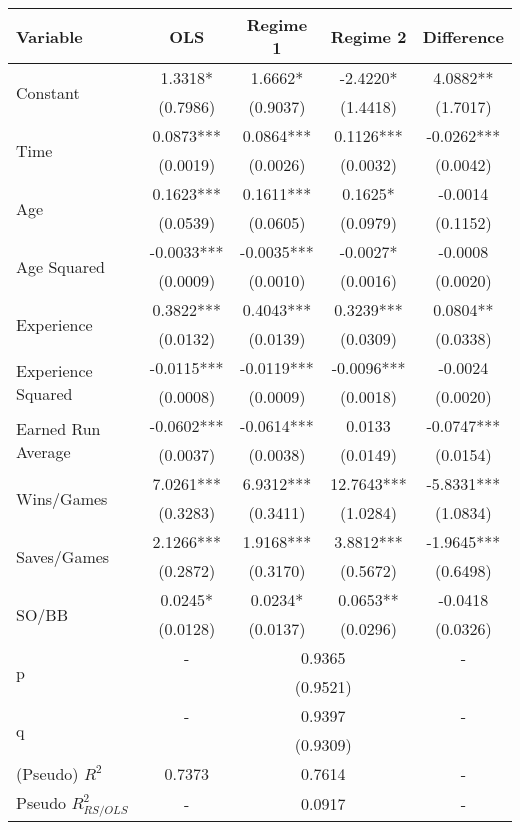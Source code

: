 \documentclass[12pt]{article}
\begin{document}
\begin{table}
\begin{center}
\begin{tabular}{l|c|cc|c} 
 Variable & OLS & Regime 1 & Regime 2 & Difference \\ \hline 

 \multirow{2}{*}{Constant} & 1.3318* & 1.6662* & -2.4220* & 4.0882** \\ 
 & (0.7986) & (0.9037) & (1.4418) & (1.7017) \\ [0.4pc]
 \multirow{2}{*}{Time} & 0.0873*** & 0.0864*** & 0.1126*** & -0.0262*** \\ 
 & (0.0019) & (0.0026) & (0.0032) & (0.0042) \\ [0.4pc]
 \multirow{2}{*}{Age} & 0.1623*** & 0.1611*** & 0.1625* & -0.0014  \\ 
 & (0.0539) & (0.0605) & (0.0979) & (0.1152) \\ [0.4pc]
 \multirow{2}{*}{Age Squared} & -0.0033*** & -0.0035*** & -0.0027* & -0.0008  \\ 
 & (0.0009) & (0.0010) & (0.0016) & (0.0020) \\ [0.4pc]
 \multirow{2}{*}{Experience} & 0.3822*** & 0.4043*** & 0.3239*** & 0.0804** \\ 
 & (0.0132) & (0.0139) & (0.0309) & (0.0338) \\ [0.4pc]
 \multirow{2}{*}{Experience Squared} & -0.0115*** & -0.0119*** & -0.0096*** & -0.0024  \\ 
 & (0.0008) & (0.0009) & (0.0018) & (0.0020) \\ [0.4pc]
 \multirow{2}{*}{Earned Run Average} & -0.0602*** & -0.0614*** & 0.0133  & -0.0747*** \\ 
 & (0.0037) & (0.0038) & (0.0149) & (0.0154) \\ [0.4pc]
 \multirow{2}{*}{Wins/Games} & 7.0261*** & 6.9312*** & 12.7643*** & -5.8331*** \\ 
 & (0.3283) & (0.3411) & (1.0284) & (1.0834) \\ [0.4pc]
 \multirow{2}{*}{Saves/Games} & 2.1266*** & 1.9168*** & 3.8812*** & -1.9645*** \\ 
 & (0.2872) & (0.3170) & (0.5672) & (0.6498) \\ [0.4pc]
 \multirow{2}{*}{SO/BB} & 0.0245* & 0.0234* & 0.0653** & -0.0418  \\ 
 & (0.0128) & (0.0137) & (0.0296) & (0.0326) \\ [0.4pc]\hline 
\multirow{2}{*}{p} & - & \multicolumn{2}{c|}{0.9365} & - \\ 
 & & \multicolumn{2}{c|}{(0.9521)} & \\ [0.4pc] 
\multirow{2}{*}{q} & - & \multicolumn{2}{c|}{0.9397} & - \\ 
 & & \multicolumn{2}{c|}{(0.9309)} & \\ \hline 
(Pseudo) $R^2$ & 0.7373 & \multicolumn{2}{c|}{0.7614} & - \\ 
Pseudo $R_{RS/OLS}^2$ & - & \multicolumn{2}{c|}{0.0917} & - \\ \hline
\end{tabular}
\end{center}
\end{table}
\end{document}
